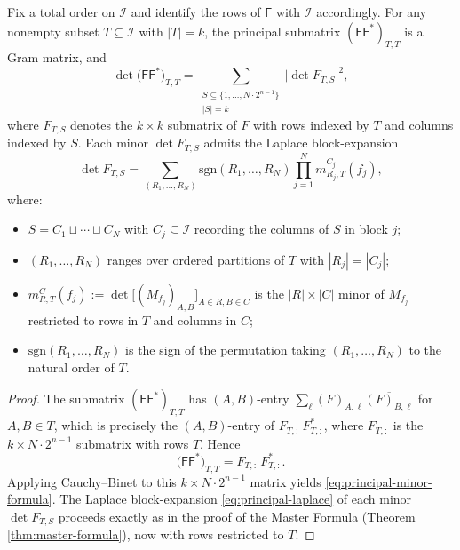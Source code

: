 \documentclass[11pt]{amsart}
\begin{document}
\begin{thm}\label{thm:principal-minors}
Fix a total order on $\mathcal I$ and identify the rows of $\mathsf{F}$ with $\mathcal I$ accordingly. For any nonempty subset $T \subseteq \mathcal I$ with $|T| = k$, the principal submatrix $(\mathsf{F} \mathsf{F}^*)_{T,T}$ is a Gram matrix, and
\begin{equation}\label{eq:principal-minor-formula}
\det\bigl( \mathsf{F} \mathsf{F}^* \bigr)_{T,T} = \sum_{\substack{S \subseteq \{1,\ldots,N \cdot 2^{n-1}\}\\ |S| = k}} \bigl|\det F_{T, S}\bigr|^2,
\end{equation}
where $F_{T, S}$ denotes the $k\times k$ submatrix of $F$ with rows indexed by $T$ and columns indexed by $S$. Each minor $\det  F_{T, S}$ admits the Laplace block-expansion
\begin{equation}\label{eq:principal-laplace}
\det F_{T, S} = \sum_{(R_1,\ldots,R_N)} \mathrm{sgn}(R_1,\ldots,R_N) \prod_{j=1}^N m_{R_j, T}^{C_j}(f_j),
\end{equation}
where:
\begin{itemize}
\item $S = C_1 \sqcup \cdots \sqcup C_N$ with $C_j \subseteq \mathcal I$ recording the columns of $S$ in block $j$;
\item $(R_1, \ldots, R_N)$ ranges over ordered partitions of $T$ with $|R_j| = |C_j|$;
\item $m_{R, T}^{C}(f_j) := \det\bigl[(M_{f_j})_{A,B}\bigr]_{A \in R, B \in C}$ is the $|R|\times|C|$ minor of $M_{f_j}$ restricted to rows in $T$ and columns in $C$;
\item $\mathrm{sgn}(R_1, \ldots, R_N)$ is the sign of the permutation taking $(R_1, \ldots, R_N)$ to the natural order of $T$.
\end{itemize}
\end{thm}

\begin{proof}
The submatrix $(\mathsf{F} \mathsf{F}^* )_{T,T}$ has $(A, B)$-entry $\displaystyle \sum_{\ell} (F)_{A, \ell} \overline{(F)_{B, \ell}}$ for $A, B \in T$, which is precisely the $(A, B)$-entry of $F_{T, :} \, F_{T, :}^*$, where $F_{T, :}$ is the $k \times N \cdot 2^{n-1}$ submatrix with rows $T$. Hence
\[
\bigl( \mathsf{F} \mathsf{F}^* \bigr)_{T,T} = F_{T,:}\,F_{T,:}^*  .
\]
Applying Cauchy--Binet to this $k \times N\cdot 2^{n-1}$ matrix yields \eqref{eq:principal-minor-formula}. The Laplace block-expansion \eqref{eq:principal-laplace} of each minor $\det F_{T, S}$ proceeds exactly as in the proof of the Master Formula (Theorem \ref{thm:master-formula}), now with rows restricted to $T$.
\end{proof}
\end{document}
